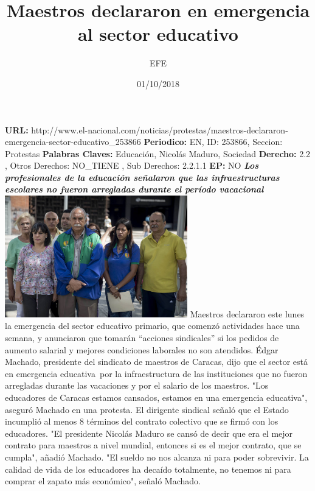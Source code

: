 \documentclass{article}%
\title{\textbf{Maestros declararon en emergencia al sector educativo}}%
\author{EFE}%
\date{01/10/2018}%
\begin{document}
%
\normalsize%
\maketitle%
\textbf{URL: }%
http://www.el{-}nacional.com/noticias/protestas/maestros{-}declararon{-}emergencia{-}sector{-}educativo\_253866\newline%
%
\textbf{Periodico: }%
EN, %
ID: %
253866, %
Seccion: %
Protestas\newline%
%
\textbf{Palabras Claves: }%
Educación, Nicolás Maduro, Sociedad\newline%
%
\textbf{Derecho: }%
2.2%
, Otros Derechos: %
NO\_TIENE%
, Sub Derechos: %
2.2.1.1%
\newline%
%
\textbf{EP: }%
NO\newline%
\newline%
%
\textbf{\textit{Los profesionales de la educación señalaron que las infraestructuras escolares no fueron arregladas durante el período vacacional~}}%
\newline%
\newline%
%
\includegraphics[width=300px]{170.jpg}%
\newline%
%
Maestros declararon este lunes la emergencia del sector educativo primario, que comenzó actividades hace una semana, y anunciaron que tomarán “acciones sindicales” si los pedidos de aumento salarial y mejores condiciones laborales no son atendidos.%
\newline%
%
Édgar Machado, presidente del sindicato de maestros de Caracas, dijo que el sector está en emergencia educativa~por la infraestructura de las instituciones que no fueron arregladas durante las vacaciones y por el salario de los maestros.%
\newline%
%
"Los educadores de Caracas estamos cansados, estamos en una emergencia educativa", aseguró Machado en una protesta.%
\newline%
%
El dirigente sindical señaló que el Estado incumplió al menos 8 términos del contrato colectivo que se firmó con los educadores.%
\newline%
%
"El presidente Nicolás Maduro se cansó de decir que era el mejor contrato para maestros a nivel mundial, entonces si es el mejor contrato, que se cumpla", añadió Machado.%
\newline%
%
"El sueldo no nos alcanza ni para poder sobrevivir. La calidad de vida de los educadores ha decaído totalmente, no tenemos ni para comprar el zapato más económico", señaló Machado.%
\newline%
%
\end{document}
